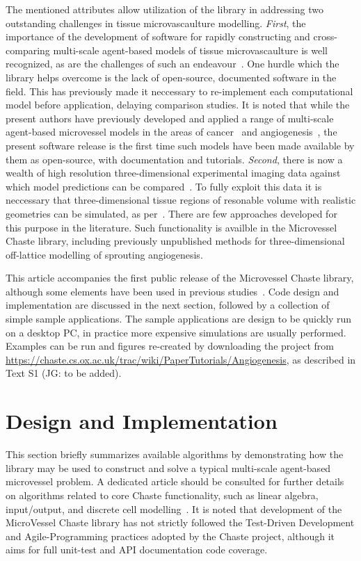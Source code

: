 \documentclass[10pt,letterpaper]{article}
\begin{document}
The mentioned attributes allow utilization of the library in addressing two outstanding challenges in tissue microvascaulture modelling. \emph{First}, the importance of the development of software for rapidly constructing and cross-comparing multi-scale agent-based models of tissue microvascaulture is well recognized, as are the challenges of such an endeavour~\cite{Rieger2015, Connor2012}. One hurdle which the library helps overcome is the lack of open-source, documented software in the field. This has previously made it neccessary to re-implement each computational model before application, delaying comparison studies. It is noted that while the present authors have previously developed and applied a range of multi-scale agent-based microvessel models in the areas of cancer~\cite{Alarcon2005, Perfahl2011} and angiogenesis~\cite{Connor2015}, the present software release is the first time such models have been made available by them as open-source, with documentation and tutorials. \emph{Second}, there is now a wealth of high resolution three-dimensional experimental imaging data against which model predictions can be compared~\cite{Tozer2004}. To fully exploit this data it is neccessary that three-dimensional tissue regions of resonable volume with realistic geometries can be simulated, as per~\cite{Grogan2016}. There are few approaches developed for this purpose in the literature. Such functionality is availble in the Microvessel Chaste library, including previously unpublished methods for three-dimensional off-lattice modelling of sprouting angiogenesis.  

This article accompanies the first public release of the Microvessel Chaste library, although some elements have been used in previous studies~\cite{Connor2015, Grogan2016}. Code design and implementation are discussed in the next section, followed by a collection of simple sample applications. The sample applications are design to be quickly run on a desktop PC, in practice more expensive simulations are usually performed. Examples can be run and figures re-created by downloading the project from \url{https://chaste.cs.ox.ac.uk/trac/wiki/PaperTutorials/Angiogenesis}, as described in Text S1 (JG: to be added). 

\section*{Design and Implementation}

This section briefly summarizes available algorithms by demonstrating how the library may be used to construct and solve a typical multi-scale agent-based microvessel problem. A dedicated article should be consulted for further details on algorithms related to core Chaste functionality, such as linear algebra, input/output, and discrete cell modelling~\cite{Mirams2013}. It is noted that development of the MicroVessel Chaste library has not strictly followed the Test-Driven Development and Agile-Programming practices adopted by the Chaste project, although it aims for full unit-test and API documentation code coverage.
\end{document}
